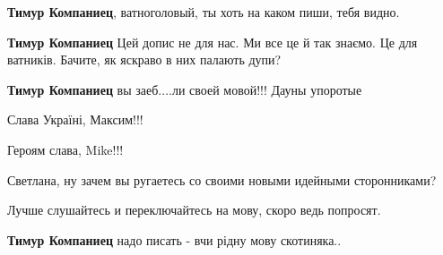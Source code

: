 \begin{itemize}
\begin{itemize}
\textbf{Тимур Компаниец}, ватноголовый, ты хоть на каком пиши, тебя видно.

 
\textbf{Тимур Компаниец} Цей допис не для нас. Ми все це й так знаємо. Це для ватників. Бачите, як яскраво в них палають дупи?

 
\textbf{Тимур Компаниец} вы заеб....ли своей мовой!!! Дауны упоротые

 
Слава Україні, Максим!!!

 
Героям слава, Mike!!!

 

Светлана, ну зачем вы ругаетесь со своими новыми идейными сторонниками?

Лучше слушайтесь и переключайтесь на мову, скоро ведь попросят.

 
\textbf{Тимур Компаниец} надо писать - вчи рідну мову скотиняка..

 

\end{itemize}
\end{itemize}
